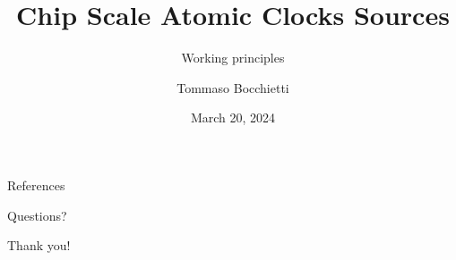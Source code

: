 \documentclass[10pt]{beamer}
\title{Chip Scale Atomic Clocks Sources}
\subtitle{Working principles}
\date{March 20, 2024}
\author{Tommaso Bocchietti}
\institute{University of Waterloo}
\begin{document}
\maketitle







\appendix



\begin{frame}[allowframebreaks]{References}
    \nocite{*}
    
\end{frame}

\begin{frame}[standout]
    Questions?
\end{frame}

\begin{frame}[standout]
    Thank you!
\end{frame}
\end{document}
